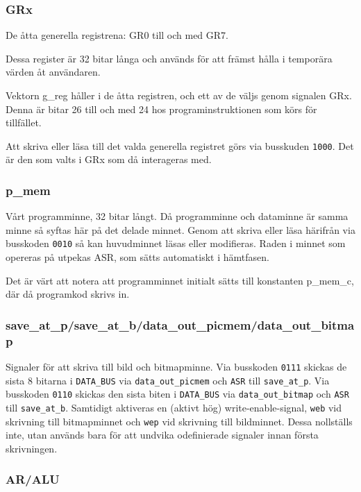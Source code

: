 \documentclass[]{article}
\begin{document}
\subsubsection{GRx}

De åtta generella registrena: GR0 till och med GR7.

Dessa register är 32 bitar långa och används för att främst hålla i temporära värden åt användaren.

Vektorn g\_reg håller i de åtta registren, och ett av de väljs genom signalen GRx. Denna är bitar 26 till och med 24 hos programinstruktionen som körs för tillfället.

Att skriva eller läsa till det valda generella registret görs via busskuden \texttt{1000}. Det är den som valts i GRx som då interageras med. 

\subsubsection{p\_mem}

Vårt programminne, 32 bitar långt. Då programminne och dataminne är samma minne så syftas här på det delade minnet. Genom att skriva eller läsa härifrån via busskoden \texttt{0010} så kan huvudminnet läsas eller modifieras. Raden i minnet som opereras på utpekas ASR, som sätts automatiskt i hämtfasen.

Det är värt att notera att programminnet initialt sätts till konstanten p\_mem\_c, där då programkod skrivs in.

\subsubsection{save\_at\_p/save\_at\_b/data\_out\_picmem/data\_out\_bitmap}

Signaler för att skriva till bild och bitmapminne. Via busskoden \texttt{0111} skickas de sista 8 bitarna i \texttt{DATA\_BUS} via \texttt{data\_out\_picmem} och \texttt{ASR} till \texttt{save\_at\_p}. Via busskoden \texttt{0110} skickas den sista biten i \texttt{DATA\_BUS} via \texttt{data\_out\_bitmap} och \texttt{ASR} till \texttt{save\_at\_b}. Samtidigt aktiveras en (aktivt hög) write-enable-signal, \texttt{web} vid skrivning till bitmapminnet och \texttt{wep} vid skrivning till bildminnet. Dessa nollställs inte, utan används bara för att undvika odefinierade signaler innan första skrivningen.

\subsubsection{AR/ALU}
\end{document}
